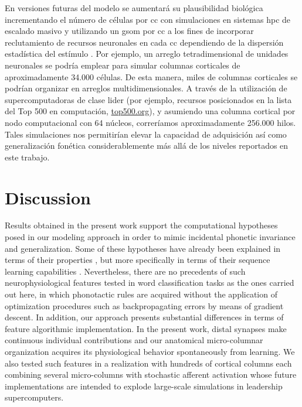 {En versiones futuras del modelo se aumentará su plausibilidad biológica incrementando el número de células por \gls{cc} con simulaciones en sistemas \gls{hpc} de escalado masivo y utilizando un \gls{gsom} por \gls{cc} a los fines de incorporar reclutamiento de recursos neuronales en cada \gls{cc} dependiendo de la dispersión estadística del estímulo \cite{Meyer19113}. Por ejemplo, un arreglo tetradimensional de unidades neuronales se podría emplear para simular columnas corticales de aproximadamente 34.000 células. De esta manera, miles de columnas corticales se podrían organizar en arreglos multidimensionales. A través de la utilización de supercomputadoras de clase lider (por ejemplo, recursos posicionados en la lista del Top 500 en computación, \url{top500.org}), y asumiendo una columna cortical por nodo computacional con 64 núcleos, correríamos aproximadamente 256.000 hilos. Tales simulaciones nos permitirían elevar la capacidad de adquisición así como generalización fonética considerablemente más allá de los niveles reportados en este trabajo.
}{
\section{Discussion}

Results obtained in the present work support the computational hypotheses posed in our modeling approach in order to mimic incidental phonetic invariance and generalization.
Some of these hypotheses have already been explained in terms of their properties \cite{hawkins_2016}, but more specifically in terms of their sequence learning capabilities \cite{cui_2016}.
Nevertheless, there are no precedents of such neurophysiological features tested in word classification tasks as the ones carried out here, in which phonotactic rules are acquired without the application of optimization procedures such as backpropagating errors by means of gradient descent. In addition, our approach presents substantial differences in terms of feature algorithmic implementation. In the present work, distal synapses make continuous individual contributions and our anatomical micro-columnar organization acquires its physiological behavior spontaneously from learning. We also tested such features in a realization with hundreds of cortical columns each combining several micro-columns with stochastic afferent activation whose future implementations are intended to explode large-scale simulations in leadership supercomputers.

}

